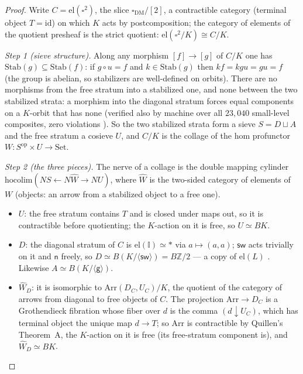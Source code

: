 \documentclass[11pt]{amsart}
\theoremstyle{definition}
\newcommand{\I}{\mathbb{I}}
\newcommand{\cube}{\square_{\mathrm{DM}}}
\newcommand{\el}{\mathrm{el}}
\newcommand{\Stab}{\mathrm{Stab}}
\newcommand{\sw}{\mathsf{sw}}
\newcommand{\nb}{\mathsf{n}}
\newcommand{\gtw}{\mathsf{g}}
\newcommand{\Kl}{K}
\newcommand{\hopush}{\mathrm{hocolim}}
\begin{document}
\begin{proof}
  Write $C = \el(\square^2)$, the slice $\cube/[2]$, a contractible
  category (terminal object $T = \mathrm{id}$) on which $\Kl$ acts
  by postcomposition; the category of elements of the quotient
  presheaf is the strict quotient: $\el(\square^2/\Kl) \cong
  C/\Kl$.

  \emph{Step 1 (sieve structure).}  Along any morphism
  $[f] \to [g]$ of $C/\Kl$ one has $\Stab(g) \subseteq \Stab(f)$:
  if $g \circ u = f$ and $k \in \Stab(g)$ then
  $k f = k g u = g u = f$ (the group is abelian, so stabilizers
  are well-defined on orbits).  There are no morphisms from the
  free stratum into a stabilized one, and none between the two
  stabilized strata: a morphism into the diagonal stratum forces
  equal components on a $\Kl$-orbit that has none (verified also
  by machine over all $23{,}040$ small-level composites, zero
  violations \cite{Artifact}).  So the two stabilized strata form
  a sieve $S = D \sqcup A$ and the free stratum a cosieve $U$, and
  $C/\Kl$ is the collage of the hom profunctor
  $W : S^{\mathrm{op}} \times U \to \mathrm{Set}$.

  \emph{Step 2 (the three pieces).}  The nerve of a collage is the
  double mapping cylinder
  $\hopush(NS \leftarrow N\widehat W \to NU)$, where $\widehat W$
  is the two-sided category of elements of $W$ (objects: an arrow
  from a stabilized object to a free one).
  \begin{itemize}
  \item $U$: the free stratum contains $T$ and is closed under
    maps out, so it is contractible before quotienting; the
    $\Kl$-action on it is free, so $U \simeq B\Kl$.
  \item $D$: the diagonal stratum of $C$ is
    $\el(\I) \simeq \ast$ via $a \mapsto (a,a)$; $\sw$ acts
    trivially on it and $\nb$ freely, so
    $D \simeq B(\Kl/\langle\sw\rangle) = B\mathbb{Z}/2$ ---
    a copy of $\el(L)$ \cite{PaperL}.  Likewise
    $A \simeq B(\Kl/\langle\gtw\rangle)$.
  \item $\widehat W_D$: it is isomorphic to
    $\mathrm{Arr}(D_C, U_C)/\Kl$, the quotient of the category of
    arrows from diagonal to free objects of $C$.  The projection
    $\mathrm{Arr} \to D_C$ is a Grothendieck fibration whose fiber
    over $d$ is the comma $(d \downarrow U_C)$, which has terminal
    object the unique map $d \to T$; so $\mathrm{Arr}$ is
    contractible by Quillen's Theorem~A, the $\Kl$-action on it is
    free (its free-stratum component is), and
    $\widehat W_D \simeq B\Kl$.
  \end{itemize}


\end{proof}
\end{document}
